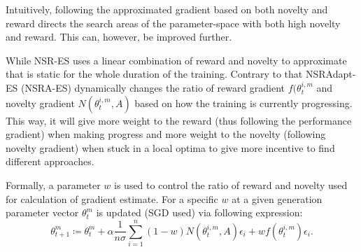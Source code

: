Intuitively, following the approximated gradient based on both novelty and reward directs the search areas of the parameter-space with both high novelty and reward. This can, however, be improved further.

While NSR-ES uses a linear combination of reward and novelty to approximate that is static for the whole duration of the training. Contrary to that NSRAdapt-ES (NSRA-ES) dynamically changes the ratio of reward gradient $f(\theta_t^{i,m}$ and novelty gradient $N(\theta_t^{i,m},A)$ based on how the training is currently progressing. This way, it will give more weight to the reward (thus following the performance gradient) when making progress and more weight to the novelty (following novelty gradient) when stuck in a local optima to give more incentive to find different approaches. 

Formally, a parameter $w$ is used to control the ratio of reward and novelty used for calculation of gradient estimate. For a specific $w$ at a given generation parameter vector $\theta_t^m$ is updated (SGD used) via following expression: 
\begin{equation}
    \theta^m_{t+1}\coloneqq\theta^m_t + \alpha \frac{1}{n\sigma}\sum_{i=1}^n (1-w)N(\theta_t^{i,m},A)\epsilon_i+wf(\theta_t^{i,m})\epsilon_i.
\end{equation}

\cite{conti2018} 
